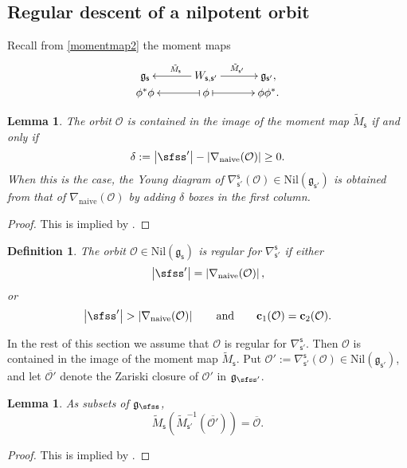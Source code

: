 \documentclass[12pt,a4paper]{amsart}
\def\abs#1{\left|{#1}\right|}
\newcommand{\CO}{{\mathcal {O}}}
\newcommand{\g}{\mathfrak g}
\def\DD{\nabla}
\numberwithin{equation}{section}
\newtheorem{lem}[thm]{Lemma}
\newtheorem{defn}[thm]{Definition}
\theoremstyle{remark}
\begin{document}
\subsection{Regular descent of a nilpotent orbit}
Recall from \eqref{momentmap2}  the moment maps
\[
    \xymatrix@R=0em@C=3em{
      \g_\mathsf s &\ar[l]_{\tilde M_\mathsf s} W_{\mathsf s, \mathsf s'}\ar[r]^{\tilde M_{\mathsf s'}}& \g_{\mathsf s'},\\
     \phi^* \phi & \ar@{|->}[l] \phi \ar@{|->}[r] & \phi \phi^*.
    }
  \]

\begin{lem}
The orbit $\CO$ is contained in the image of the moment map $\tilde M_{\mathsf s}$ if and only if
\[
 \delta:=  \abs{\sfss'}-\abs{\DD_\mathrm{naive}(\CO)}\geq 0.
\]
When this is the case, the Young diagram of $\DD_{\mathsf s'}^{\mathsf s}(\CO)\in \mathrm{Nil}(\g_{\mathsf s'})$ is obtained from that of $\DD_\mathrm{naive}(\CO)$ by adding $\delta$ boxes in the first column.

\end{lem}
\begin{proof}
This is implied by \cite[Theorem 3.6]{DKPC}.
\end{proof}

\begin{defn}
The orbit $\CO\in \mathrm{Nil}(\g_\mathsf s)$ is regular for $\DD_{\mathsf s'}^{\mathsf s}$ if
either
\[
\abs{\sfss'}=\abs{\DD_\mathrm{naive}(\CO)},
\]
 or
 \[
 \abs{\sfss'}>\abs{\DD_\mathrm{naive}(\CO)}\qquad\textrm{and}\qquad \mathbf c_1(\CO)=\mathbf c_2(\CO).
\]

\end{defn}



In the rest of this section we assume that $\CO$ is regular for $\DD_{\mathsf s'}^{\mathsf s}$. Then $\CO$ is contained in the image of the moment map $\tilde M_{\mathsf s}$. Put  $\CO':=\DD_{\mathsf s'}^{\mathsf s}(\CO)\in  \mathrm{Nil}(\g_{\mathsf s'})$, and let  $\overline{\CO'}$ denote the Zariski closure of $\CO'$ in $\g_{\sfss'}$.


\begin{lem}\label{liftop0}
As subsets of $\g_\sfss$,
\[
  \tilde M_{\mathsf s}(\tilde M_{\mathsf s'}^{-1}(\overline{\CO'}))=\overline{\CO}.
\]
\end{lem}
\begin{proof}
This is implied by \cite[Theorems 5.2 and 5.6]{DKPC}.
\end{proof}
\end{document}

